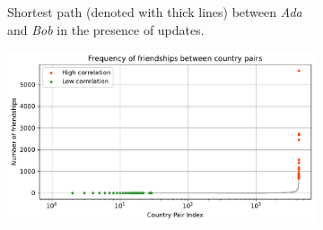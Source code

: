 \newsavebox{\largestimage}
\begin{figure}[htb]
    \vspace{-2.5ex}
    \begin{subfigure}{0.36\textwidth} 
        \centering
        \caption{
            Shortest path (denoted with thick lines) between \emph{Ada} and \emph{Bob} in the presence of updates.
        }
        \label{fig:paths}
    \end{subfigure}
    \hspace{2mm}
    \begin{subfigure}{0.61\textwidth}
        \centering
        \includegraphics[width=\linewidth]{figures/paramgen/paramgen-frequency-disc-countries}

\end{subfigure}
\end{figure}
